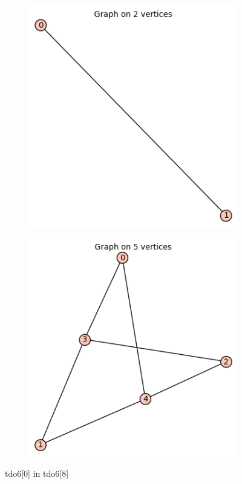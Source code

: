 \documentclass[12pt, a4paper]{article}
\begin{document}
\begin{center}
\begin{figure}[!htb]
\centering
\begin{subfigure}{0.5\textwidth}
  \centering
  \includegraphics[width=0.5\linewidth]{tdo6[0]}
\end{subfigure}%
\begin{subfigure}{0.5\textwidth}
  \centering
  \includegraphics[width=0.5\linewidth]{tdo6[8]}
\end{subfigure}
\caption{tdo6[0] in tdo6[8]}
\label{fig:test}
\end{figure}


\end{center}
\end{document}
